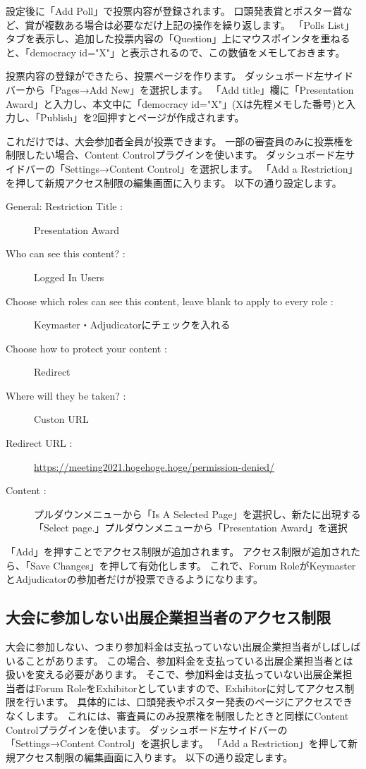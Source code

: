 \documentclass[titlepage,10pt,a4paper,uplatex]{jsbook}
\begin{document}
設定後に「Add Poll」で投票内容が登録されます。
口頭発表賞とポスター賞など、賞が複数ある場合は必要なだけ上記の操作を繰り返します。
「Polls List」タブを表示し、追加した投票内容の「Question」上にマウスポインタを重ねると、「{\lbrack}democracy id="X"{\rbrack}」と表示されるので、この数値をメモしておきます。

投票内容の登録ができたら、投票ページを作ります。
ダッシュボード左サイドバーから「Pages→Add New」を選択します。
「Add title」欄に「Presentation Award」と入力し、本文中に「{\lbrack}democracy id="X"{\rbrack}」(Xは先程メモした番号)と入力し、「Publish」を2回押すとページが作成されます。

これだけでは、大会参加者全員が投票できます。
一部の審査員のみに投票権を制限したい場合、Content Controlプラグインを使います。
ダッシュボード左サイドバーの「Settings→Content Control」を選択します。
「Add a Restriction」を押して新規アクセス制限の編集画面に入ります。
以下の通り設定します。

\begin{description}
\item[General: Restriction Title : ] Presentation Award
\item[Who can see this content? : ] Logged In Users
\item[Choose which roles can see this content, leave blank to apply to every role : ] Keymaster・Adjudicatorにチェックを入れる
\item[Choose how to protect your content : ] Redirect
\item[Where will they be taken? : ] Custon URL
\item[Redirect URL : ] \url{https://meeting2021.hogehoge.hoge/permission-denied/}
\item[Content : ] プルダウンメニューから「Is A Selected Page」を選択し、新たに出現する「Select page.」プルダウンメニューから「Presentation Award」を選択
\end{description}

「Add」を押すことでアクセス制限が追加されます。
アクセス制限が追加されたら、「Save Changes」を押して有効化します。
これで、Forum RoleがKeymasterとAdjudicatorの参加者だけが投票できるようになります。

\subsection{大会に参加しない出展企業担当者のアクセス制限}

大会に参加しない、つまり参加料金は支払っていない出展企業担当者がしばしばいることがあります。
この場合、参加料金を支払っている出展企業担当者とは扱いを変える必要があります。
そこで、参加料金は支払っていない出展企業担当者はForum RoleをExhibitorとしていますので、Exhibitorに対してアクセス制限を行います。
具体的には、口頭発表やポスター発表のページにアクセスできなくします。
これには、審査員にのみ投票権を制限したときと同様にContent Controlプラグインを使います。
ダッシュボード左サイドバーの「Settings→Content Control」を選択します。
「Add a Restriction」を押して新規アクセス制限の編集画面に入ります。
以下の通り設定します。
\end{document}
